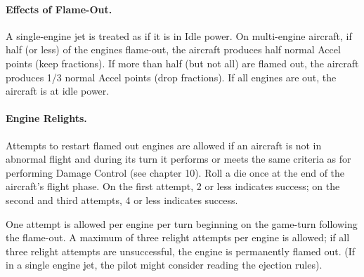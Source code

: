 \paragraph{Effects of Flame-Out.} A single-engine jet is treated as if it is in Idle power. On multi-engine aircraft, if half (or less) of the engines flame-out, the aircraft produces half normal Accel points (keep fractions). If more than half (but not all) are flamed out, the aircraft produces 1/3 normal Accel points (drop fractions). If all engines are out, the aircraft is at idle power.

\paragraph{Engine Relights.} Attempts to restart flamed out engines are allowed if an aircraft is not in abnormal flight and during its turn it performs or meets the same criteria as for performing Damage Control (see chapter 10). Roll a die once at the end of the aircraft's flight phase. On the first attempt, 2 or less indicates success; on the second and third attempts, 4 or less indicates success.

One attempt is allowed per engine per turn beginning on the game-turn following the flame-out. A maximum of three relight attempts per engine is allowed; if all three relight attempts are unsuccessful, the engine is permanently flamed out. (If in a single engine jet, the pilot might consider reading the ejection rules).


